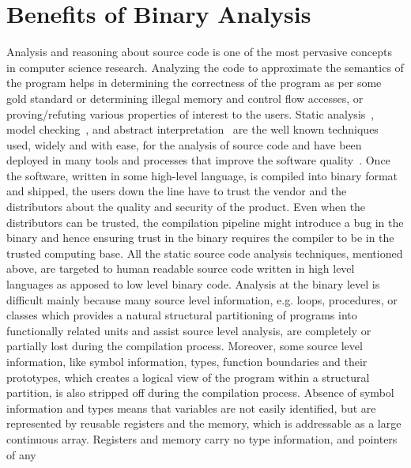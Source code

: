 \chapter{Benefits of Binary Analysis}\label{sec:ba}
Analysis and reasoning about source code is one of the most pervasive concepts
in computer science research. Analyzing the code to approximate  the semantics
of the program helps in determining the correctness of the program as per some
gold standard or determining illegal memory and control flow accesses, or
proving/refuting various properties of interest to the users. Static
analysis~\cite{Nielson2010}, model checking~\cite{Clarke1981,Queille1982}, and
abstract interpretation~\cite{Cousot1977} are the well known techniques used,
         widely and with ease, for the  analysis of source code and have been
         deployed in many tools and processes that improve the software
         quality~\cite{Xie:2003,Musuvathi:2008,Ivancic:2005,Dwyer:2007,Binkley:2007,Bessey2010,Ball2006}.
         Once the software, written in some high-level language, is compiled
         into binary format and shipped, the users down the line have to trust
         the vendor and the distributors about the quality and security of the
         product. Even when the distributors can be trusted, the compilation
         pipeline might introduce a bug in the binary and hence ensuring trust
         in the binary requires the compiler to be in the trusted computing
         base.  All the static source code analysis techniques, mentioned
         above, are targeted to human readable source code written in high
         level languages as apposed to low level binary code. Analysis at the
         binary level is difficult mainly because many source level
         information, e.g. loops, procedures, or classes which provides a
         natural structural partitioning of programs into functionally related
         units and assist source level analysis, are completely or partially
         lost during the compilation process. Moreover, some source level
         information, like symbol information, types, function boundaries and
         their prototypes, which creates a logical view of the program  within
         a structural partition, is also stripped off during the compilation
         process. Absence of symbol information and types means that variables
         are not easily identified, but are represented by reusable registers
         and the memory, which is addressable as a large continuous array.
         Registers and memory carry no type information, and pointers of any
